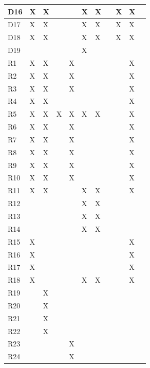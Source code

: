 \documentclass{article}
\begin{document}
\begin{longtable}[c]{|m{0.15cm}|m{0.15cm}|m{0.15cm}|m{0.15cm}|m{0.15cm}|m{0.15cm}|m{0.15cm}|m{0.15cm}|m{0.15cm}|m{0.15cm}|m{0.15cm}|}
 \hline
 D16 &X   & X  &   &   & X  & X  &   & X  &  X    \\
 \hline
 D17 &X   & X  &   &   & X  & X  &   & X  & X     \\
 \hline
 D18 &X   & X  &   &   & X  & X  &   &  X & X     \\
 \hline
 D19 &   &   &   &   & X  &   &   &   &      \\
 \hline
 R1 & X & X &  & X  &  &   &  &   &X    \\
 \hline
 R2 & X & X &  & X  &  &   &  &   &    X \\
 \hline
 R3 & X & X &  & X  &  &   &  &   &    X \\
 \hline
 R4 & X & X &  &  &  &   &  &   &    X \\
 \hline
 R5 & X & X  & X  & X  & X  & X  &  &   &    X \\
 \hline
 R6 & X & X  &   & X  &   &   &   &   &  X    \\
 \hline
 R7 & X & X  &   & X  &   &   &   &   & X     \\
 \hline
 R8 & X & X  &   & X  &   &   &   &   &  X   \\
 \hline
 R9 &X   & X &   &  X &   &   &   &   & X     \\
 \hline
 R10 &X   & X &  & X  &   &   &   &   & X    \\
 \hline
 R11 &X   & X &  &   & X  & X  &   &   &   X   \\
 \hline
 R12 &    &   &  &   & X  & X  &   &   &   \\
 \hline
 R13 &    &   &  &   & X  &  X &   &   &   \\
 \hline
 R14 &    &   &  &   & X  & X  &   &   &   \\
 \hline
 R15 &X   &  &   &   &   &   &   &   & X     \\
 \hline
 R16 &X   &  &   &   &   &   &   &   & X     \\
 \hline
 R17 & X  &   &  &   &  &   &   &   &  X    \\
 \hline
 R18 & X  &   &  &   & X  & X  &   &   &  X    \\
 \hline
 R19 &   & X  &   &  &   &   &   &   &      \\
 \hline
 R20 &   & X  &   &  &  &   &   &   &     \\
 \hline
 R21 &   & X  &   &  &   &   &   &   &     \\
 \hline
 R22 &   & X  &   &   &   &   &  &   &     \\
 \hline
 R23 &   &   &   & X  &   &   &   &   &     \\
 \hline
 R24 &   &   &   & X  &   &   &   &   &     \\

\end{longtable}
\end{document}
